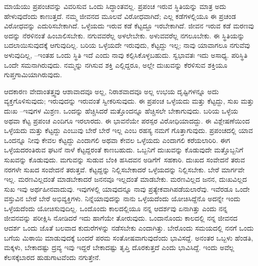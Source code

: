 ಮಾಯೆಯು ಪ್ರಪಂಚವನ್ನು ವಿವರಿಸುವ ಒಂದು ಸಿದ್ಧಾಂತವಲ್ಲ. ಪ್ರಪಂಚ ಇರುವ ಸ್ಥಿತಿಯನ್ನು ಮಾತ್ರ ಅದು ಹೇಳುವುದೆಂದು ಕಾಣುತ್ತದೆ. ನಮ್ಮ ಜೀವನದ ಮೂಲವೆ ವಿರೋಧವಾಗಿದೆ; ಎಲ್ಲ ಕಡೆಗಳಲ್ಲಿಯೂ ಈ ಪ್ರಚಂಡ ವಿರೋಧವನ್ನು ಎದುರಿಸಬೇಕಾಗಿದೆ. ಒಳ್ಳೆಯದು ಇರುವ ಕಡೆ ಕೆಟ್ಟದ್ದೂ ಇರಬೇಕಾಗಿದೆ. ಜೀವನ ಇರುವ ಕಡೆ ಮರಣವು ಅದನ್ನು ನೆರಳಿನಂತೆ ಹಿಂಬಾಲಿಸಬೇಕು. ನಗುವವರೆಲ್ಲ ಅಳಲೇಬೇಕು. ಅಳುವವರೆಲ್ಲ ನಗಲೂಬೇಕು. ಈ ಸ್ಥಿತಿಯನ್ನು ಬದಲಾಯಿಸುವುದಕ್ಕೆ ಆಗುವುದಿಲ್ಲ. ಬರಿಯ ಒಳ್ಳೆಯದೇ ಇರುವುದು, ಕೆಟ್ಟದ್ದು ಇಲ್ಲ; ನಾವು ಯಾವಾಗಲೂ ನಗುವೆವು ಅಳುವುದಿಲ್ಲ, –ಇಂತಹ ಒಂದು ಸ್ಥಿತಿ ಇದೆ ಎಂದು ನಾವು ಕಲ್ಪಿಸಿಕೊಳ್ಳಬಹುದು. ಸ್ವಭಾವತಃ ಇದು ಅಸಾಧ್ಯ. ಪರಿಸ್ಥಿತಿ ಒಂದೇ ಸಮನಾಗಿರುವುದು. ನಮ್ಮನ್ನು ನಗಿಸುವ ಶಕ್ತಿ ಎಲ್ಲಿದ್ದರೂ, ಅಲ್ಲೇ ದುಃಖವನ್ನು ಕೆರಳಿಸುವ ಶಕ್ತಿಯೂ ಗುಪ್ತಗಾಮಿಯಾಗಿರುವುದು.


ಆದಕಾರಣ ವೇದಾಂತತ್ತ್ವವು ಆಶಾವಾದವೂ ಅಲ್ಲ, ನಿರಾಶವಾದವೂ ಅಲ್ಲ ಉಭಯ ದೃಷ್ಟಿಗಳನ್ನೂ ಅದು ವ್ಯಕ್ತಗೊಳಿಸುವುದು; ಇರುವುದನ್ನು ಇರುವಂತೆ ಸ್ವೀಕರಿಸುವುದು. ಈ ಪ್ರಪಂಚ ಒಳ್ಳೆಯದು ಮತ್ತು ಕೆಟ್ಟದ್ದು, ಸುಖ ಮತ್ತು ದುಃಖ –ಇವುಗಳ ಮಿಶ್ರಣ. ಒಂದನ್ನು ಹೆಚ್ಚಿಸಿದರೆ ಮತ್ತೊಂದನ್ನೂ ಹೆಚ್ಚಿಸಲೇ ಬೇಕಾಗುವುದು. ಬರಿಯ ಒಳ್ಳೆಯ ಅಥವಾ ಕೆಟ್ಟ ಪ್ರಪಂಚ ಎಂದಿಗೂ ಇರಲಾರದು. ಈ ಭಾವನೆಯೇ ಪರಸ್ಪರ ವಿರೋಧಿಯಾದದ್ದು. ಈ ವಿಶ್ಲೇಷಣೆಯಿಂದ ಒಳ್ಳೆಯದು ಮತ್ತು ಕೆಟ್ಟದ್ದು ಎಂಬುವು ಬೇರೆ ಬೇರೆ ಇಲ್ಲ ಎಂಬ ರಹಸ್ಯ ನಮಗೆ ಗೊತ್ತಾಗುವುದು. ಪ್ರಪಂಚದಲ್ಲಿ ಯಾವ ಒಂದನ್ನೂ ನೀವು ಕೇವಲ ಕೆಟ್ಟದ್ದು ಎಂದಾಗಲಿ ಅಥವಾ ಕೇವಲ ಒಳ್ಳೆಯದು ಎಂದಾಗಲಿ ಕರೆಯಲಾರಿರಿ. ಈಗ ಒಳ್ಳೆಯದರಂತಿರುವ ಘಟನೆ ನಾಳೆ ಕೆಟ್ಟದ್ದರಂತೆ ಕಾಣಬಹುದು. ಒಬ್ಬನಿಗೆ ದುಃಖವನ್ನು ಕೊಡುವುದೇ ಮತ್ತೊಬ್ಬನಿಗೆ ಸುಖವನ್ನು ಕೊಡುವುದು. ಮಗುವನ್ನು ಸುಡುವ ಬೆಂಕಿ ಹಸಿದವನ ಅಡಿಗೆಗೆ\break\ ಸಹಕಾರಿ. ದುಃಖದ ಸಂವೇದನೆ ತರುವ ನರಗಳೇ ಸುಖದ ಸಂವೇದನೆ ತರುತ್ತವೆ. ಕೆಟ್ಟದ್ದನ್ನು ನಿಲ್ಲಿಸಬೇಕಾದರೆ ಒಳ್ಳೆಯದನ್ನು ನಿಲ್ಲಿಸಬೇಕು. ಬೇರೆ ಮಾರ್ಗವೇ ಇಲ್ಲ. ಮರಣವಿಲ್ಲದಂತೆ ಮಾಡಬೇಕಾದರೆ ಜನನವೂ ಇಲ್ಲದಂತೆ ಮಾಡಬೇಕು. ಮರಣವಿಲ್ಲದ ಜನನ, ದುಃಖವಿಲ್ಲದ ಸುಖ ಇವು ಅರ್ಥಹೀನವಾದುವು. ಇವುಗಳಲ್ಲಿ ಯಾವುದನ್ನೂ ನಾವು ಪ್ರತ್ಯೇಕವಾಗಿ\break ಪಡೆಯಲಾರೆವು. ಇವೆರಡೂ ಒಂದೇ ವಸ್ತುವಿನ ಬೇರೆ ಬೇರೆ ಅಭಿವ್ಯಕ್ತಿಗಳು. ನಿನ್ನೆ\break ಯಾವುದನ್ನು ನಾನು ಒಳ್ಳೆಯದೆಂದು ಯೋಚಿಸಿದ್ದೆನೊ ಅದನ್ನೇ ಇಂದು ಒಳ್ಳೆಯದೆಂದು ಯೋಚಿಸುವುದಿಲ್ಲ. ಒಂದೊಂದು ಕಾಲದಲ್ಲಿಯೂ ನನ್ನ ಆದರ್ಶವು ಏನಾಗಿತ್ತು ಎಂದು ನನ್ನ ಜೀವನವನ್ನು ಪರೀಕ್ಷಿಸಿ ನೋಡಿದರೆ ಇದು ಹಾಗೆಯೇ ತೋರುವುದು. ಒಂದಾನೊಂದು ಕಾಲದಲ್ಲಿ ನನ್ನ ಜೀವನದ ಆದರ್ಶ ಒಂದು ಜೊತೆ ಬಲವಾದ ಕುದುರೆಗಳನ್ನು ನಡೆಸಬೇಕು ಎಂದಾಗಿತ್ತು. ಬೇರೊಂದು ಸಮಯದಲ್ಲಿ ನನಗೆ ಒಂದು ಬಗೆಯ ಮಿಠಾಯಿ ಮಾಡುವುದಕ್ಕೆ ಬಂದರೆ ಪರಮ ಸಂತೋಷವಾಗುವುದೆಂದು ಭಾವಿಸದ್ದೆ. ಅನಂತರ ಒಬ್ಬಳು ಹೆಂಡತಿ, ಮಕ್ಕಳು, ಬೇಕಾದಷ್ಟು ದ್ರವ್ಯ ಇವು ಇದ್ದರೆ ಬೇಕಾದಷ್ಟು ತೃಪ್ತಿ ದೊರಕುತ್ತದೆ ಎಂದು ಭಾವಿಸಿದ್ದೆ. ಇಂದು ಅವೆಲ್ಲ ಕೆಲಸಕ್ಕೆಬಾರದ ಹುಡುಗಾಟವೆಂದು ನಗುತ್ತೇನೆ.


